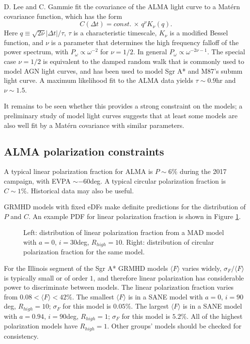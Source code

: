 \documentclass[twocolumn,tighten,dvipsnames]{aastex63}
\newcommand\<{{\langle}}
\renewcommand\>{{\rangle}} %
\begin{document}
D. Lee and C. Gammie fit the covariance of the ALMA light curve to a Mat\'ern covariance function, which has the form
\begin{equation}
    C(\Delta t) = const. \, \times \, q^\nu K_\nu(q).
\end{equation}
Here $q \equiv \sqrt{2\nu} |\Delta t|/\tau$, $\tau$ is a characteristic timescale, $K_\nu$ is a modified Bessel function, and $\nu$ is a parameter that determines the high frequency falloff of the power spectrum, with $P_\omega \propto \omega^{-2}$ for $\nu = 1/2$.  In general $P_\omega \propto \omega^{-2\nu - 1}$. The special case $\nu = 1/2$ is equivalent to the damped random walk that is commonly used to model AGN light curves, and has been used to model Sgr A* and M87's submm light curve. A maximum likelihood fit to the ALMA data yields $\tau \sim 0.9$hr and $\nu \sim 1.5$.

It remains to be seen whether this provides a strong constraint on the models; a preliminary study of model light curves suggests that at least some models are also well fit by a Mat\'ern covariance with similar parameters.

\subsection{ALMA polarization constraints}
\label{sec:polconst}

A typical linear polarization fraction for ALMA is $P \sim 6\%$ during the 2017 campaign, with EVPA $\sim -60$deg.  A typical circular polarization fraction is $C \sim 1\%$.  Historical data may also be useful.

GRMHD models with fixed eDFs make definite predictions for the distribution of $P$ and $C$.  An example PDF for linear polarization fraction is shown in Figure \ref{fig:lpexamp}.

\begin{figure}
    \centering
    \caption{Left: distribution of linear polarization fraction from a MAD model with $a = 0$, $i = 30$deg, $R_{high} = 10$. Right: distribution of circular polarization fraction for the same model.}
    \label{fig:lpexamp}
\end{figure}

For the Illinois segment of the Sgr A* GRMHD models $\< F\>$ varies widely, $\sigma_F/\<F\>$ is typically small or of order $1$, and therefore linear polarization has considerable power to discriminate between models.  The linear polarization fraction varies from $0.08 < \<F\> < 42 \%$.  The smallest $\<F\>$ is in a SANE model with $a = 0$, $i = 90$deg, $R_{high} = 10$; $\sigma_F$ for this model is $0.05\%$. The largest $\<F\>$ is in a SANE model with $a = 0.94$, $i = 90$deg, $R_{high} = 1$; $\sigma_F$ for this model is $5.2\%$.  All of the highest polarization models have $R_{high} = 1$.  Other groups' models should be checked for consistency.
\end{document}
